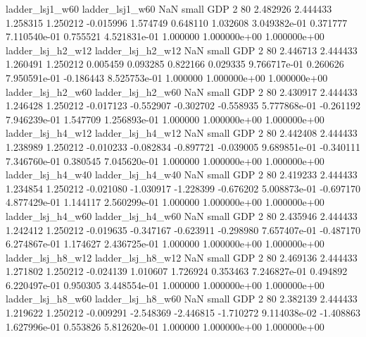          ladder_lsj1_w60          ladder_lsj1_w60                   NaN      small      GDP                 2 80 2.482926       2.444433 1.258315       1.250212   -0.015996      1.574749      0.648110     1.032608   3.049382e-01  0.371777 7.110540e-01     0.755521   4.521831e-01            1.000000    1.000000e+00        1.000000e+00
       ladder_lsj_h2_w12        ladder_lsj_h2_w12                   NaN      small      GDP                 2 80 2.446713       2.444433 1.260491       1.250212    0.005459      0.093285      0.822166     0.029335   9.766717e-01  0.260626 7.950591e-01    -0.186443   8.525753e-01            1.000000    1.000000e+00        1.000000e+00
       ladder_lsj_h2_w60        ladder_lsj_h2_w60                   NaN      small      GDP                 2 80 2.430917       2.444433 1.246428       1.250212   -0.017123     -0.552907     -0.302702    -0.558935   5.777868e-01 -0.261192 7.946239e-01     1.547709   1.256893e-01            1.000000    1.000000e+00        1.000000e+00
       ladder_lsj_h4_w12        ladder_lsj_h4_w12                   NaN      small      GDP                 2 80 2.442408       2.444433 1.238989       1.250212   -0.010233     -0.082834     -0.897721    -0.039005   9.689851e-01 -0.340111 7.346760e-01     0.380545   7.045620e-01            1.000000    1.000000e+00        1.000000e+00
       ladder_lsj_h4_w40        ladder_lsj_h4_w40                   NaN      small      GDP                 2 80 2.419233       2.444433 1.234854       1.250212   -0.021080     -1.030917     -1.228399    -0.676202   5.008873e-01 -0.697170 4.877429e-01     1.144117   2.560299e-01            1.000000    1.000000e+00        1.000000e+00
       ladder_lsj_h4_w60        ladder_lsj_h4_w60                   NaN      small      GDP                 2 80 2.435946       2.444433 1.242412       1.250212   -0.019635     -0.347167     -0.623911    -0.298980   7.657407e-01 -0.487170 6.274867e-01     1.174627   2.436725e-01            1.000000    1.000000e+00        1.000000e+00
       ladder_lsj_h8_w12        ladder_lsj_h8_w12                   NaN      small      GDP                 2 80 2.469136       2.444433 1.271802       1.250212   -0.024139      1.010607      1.726924     0.353463   7.246827e-01  0.494892 6.220497e-01     0.950305   3.448554e-01            1.000000    1.000000e+00        1.000000e+00
       ladder_lsj_h8_w60        ladder_lsj_h8_w60                   NaN      small      GDP                 2 80 2.382139       2.444433 1.219622       1.250212   -0.009291     -2.548369     -2.446815    -1.710272   9.114038e-02 -1.408863 1.627996e-01     0.553826   5.812620e-01            1.000000    1.000000e+00        1.000000e+00

